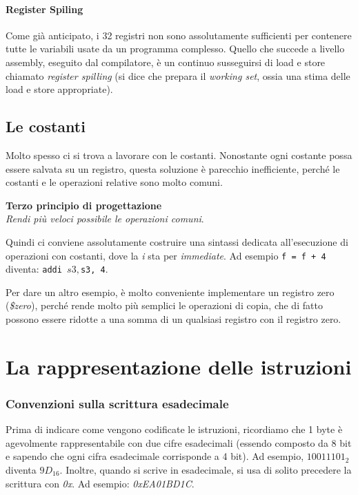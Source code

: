 \documentclass[class=book, crop=false]{standalone}
\begin{document}
\paragraph{Register Spiling}
Come già anticipato, i 32 registri non sono assolutamente sufficienti per contenere tutte le variabili usate da un programma complesso. Quello che succede a livello assembly, eseguito dal compilatore, è un continuo susseguirsi di load e store chiamato \emph{register spilling} (si dice che prepara il \emph{working set}, ossia una stima delle load e store appropriate).

\subsection*{Le costanti}
Molto spesso ci si trova a lavorare con le costanti. Nonostante ogni costante possa essere salvata su un registro, questa soluzione è parecchio inefficiente, perché le costanti e le operazioni relative sono molto comuni.

\vspace{8pt}
\begin{tcolorbox}
\centering
\textbf{Terzo principio di progettazione}\\
\emph{Rendi più veloci possibile le operazioni comuni}.
\end{tcolorbox}
\vspace{5pt}

Quindi ci conviene assolutamente costruire una sintassi dedicata all'esecuzione di operazioni con costanti, dove la \emph{i} sta per \emph{immediate}. Ad esempio \texttt{f = f + 4} diventa: \texttt{addi $s3, $s3, 4}.

Per dare un altro esempio, è molto conveniente implementare un registro zero (\emph{\$zero}), perché rende molto più semplici le operazioni di copia, che di fatto possono essere ridotte a una somma di un qualsiasi registro con il registro zero.

\section{La rappresentazione delle istruzioni}

\subsubsection{Convenzioni sulla scrittura esadecimale}
Prima di indicare come vengono codificate le istruzioni, ricordiamo che 1 byte è agevolmente rappresentabile con due cifre esadecimali (essendo composto da 8 bit e sapendo che ogni cifra esadecimale corrisponde a 4 bit). Ad esempio, \(1001 1101_{2}\) diventa \(9D_{16}\). Inoltre, quando si scrive in esadecimale, si usa di solito precedere la scrittura con \emph{0x}. Ad esempio: \emph{0xEA01BD1C}.
\end{document}
